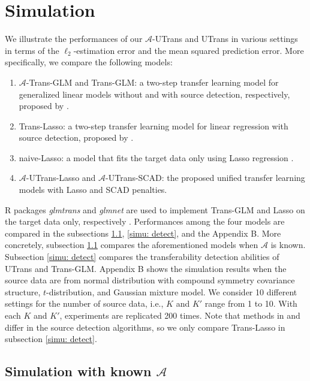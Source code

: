 \documentclass[twoside,12pt]{article}
\begin{document}
\section{Simulation}
\label{sec: simu}	
	We illustrate the performances of our $\mathcal A$-UTrans and UTrans in various settings in terms of the $\ell_2$-estimation error and the mean squared prediction error.
	More specifically, we compare the following models:
	\begin{enumerate}
		\item $\mathcal A$-Trans-GLM and Trans-GLM: a two-step transfer learning model for generalized linear models without and with source detection, respectively, proposed by \cite{tian2022transfer}.
  \item Trans-Lasso: a two-step transfer learning model for linear regression with source detection, proposed by \cite{Li2022}.
		\item naive-Lasso: a model that fits the target data only using Lasso regression \citep{tibshirani1996regression}.
		\item $\mathcal A$-UTrans-Lasso and $\mathcal A$-UTrans-SCAD: the proposed unified transfer learning models with Lasso and SCAD penalties.
	\end{enumerate}

R packages \textit{glmtrans} and \textit{glmnet} are used to implement Trans-GLM and Lasso on the target data only, respectively \citep{R20220}. 
Performances among the four models are compared in the subsections \ref{simu: normal}, \ref{simu: detect}, and the Appendix B. 
	More concretely, subsection \ref{simu: normal} compares the aforementioned models when $\mathcal A$ is known.
	Subsection \ref{simu: detect} compares the transferability detection abilities of UTrans and Trans-GLM.
	Appendix B shows the simulation results when the source data are from normal distribution with compound symmetry covariance structure, $t$-distribution, and Gaussian mixture model.
 We consider 10 different settings for the number of source data, i.e., $K$ and $K'$ range from 1 to 10. 
With each $K$ and $K'$, experiments are replicated 200 times. 
Note that methods in \cite{Li2022} and \cite{tian2022transfer} differ in the source detection algorithms, so we only compare Trans-Lasso in subsection  \ref{simu: detect}.
	
\subsection{Simulation with known $\mathcal A$}
	\label{simu: normal}
\end{document}
